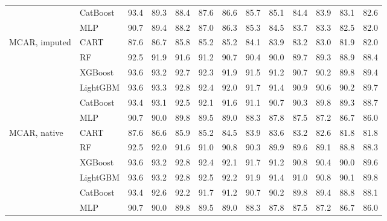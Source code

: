 \begin{table}[p]
\begin{tabular}{@{}llrrrrrrrrrrr@{}}
 & CatBoost & 93.4 & 89.3 & 88.4 & 87.6 & 86.6 & 85.7 & 85.1 & 84.4 & 83.9 & 83.1 & 82.6 \\
 & MLP & 90.7 & 89.4 & 88.2 & 87.0 & 86.3 & 85.3 & 84.5 & 83.7 & 83.3 & 82.5 & 82.0 \\
\midrule
MCAR, imputed & CART & 87.6 & 86.7 & 85.8 & 85.2 & 85.2 & 84.1 & 83.9 & 83.2 & 83.0 & 81.9 & 82.0 \\
 & RF & 92.5 & 91.9 & 91.6 & 91.2 & 90.7 & 90.4 & 90.0 & 89.7 & 89.3 & 88.9 & 88.4 \\
 & XGBoost & 93.6 & 93.2 & 92.7 & 92.3 & 91.9 & 91.5 & 91.2 & 90.7 & 90.2 & 89.8 & 89.4 \\
 & LightGBM & 93.6 & 93.3 & 92.8 & 92.4 & 92.0 & 91.7 & 91.4 & 90.9 & 90.6 & 90.2 & 89.7 \\
 & CatBoost & 93.4 & 93.1 & 92.5 & 92.1 & 91.6 & 91.1 & 90.7 & 90.3 & 89.8 & 89.3 & 88.7 \\
 & MLP & 90.7 & 90.0 & 89.8 & 89.5 & 89.0 & 88.3 & 87.8 & 87.5 & 87.2 & 86.7 & 86.0 \\
\midrule
MCAR, native & CART & 87.6 & 86.6 & 85.9 & 85.2 & 84.5 & 83.9 & 83.6 & 83.2 & 82.6 & 81.8 & 81.8 \\
 & RF & 92.5 & 92.0 & 91.6 & 91.0 & 90.8 & 90.3 & 89.9 & 89.6 & 89.1 & 88.8 & 88.3 \\
 & XGBoost & 93.6 & 93.2 & 92.8 & 92.4 & 92.1 & 91.7 & 91.2 & 90.8 & 90.4 & 90.0 & 89.6 \\
 & LightGBM & 93.6 & 93.2 & 92.8 & 92.5 & 92.2 & 91.9 & 91.4 & 91.0 & 90.8 & 90.1 & 89.8 \\
 & CatBoost & 93.4 & 92.6 & 92.2 & 91.7 & 91.2 & 90.7 & 90.2 & 89.8 & 89.4 & 88.8 & 88.1 \\
 & MLP & 90.7 & 90.0 & 89.8 & 89.5 & 89.0 & 88.3 & 87.8 & 87.5 & 87.2 & 86.7 & 86.0 \\
\bottomrule
\end{tabular}
\end{table}


